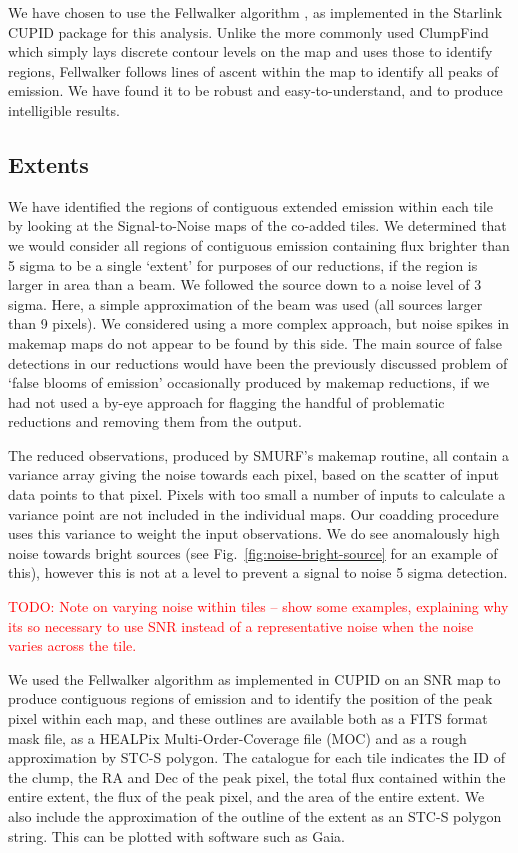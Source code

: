 \documentclass[usenatbib]{mnras}
\newcommand{\todo}[1]{\textcolor{red}{TODO: #1}}
\begin{document}
We have chosen to use the Fellwalker algorithm \citep{Berry2015}, as
implemented in the Starlink CUPID \citep{cupid} package for this
analysis. Unlike the more commonly used ClumpFind which simply lays
discrete contour levels on the map and uses those to identify regions,
Fellwalker follows lines of ascent within the map to identify all
peaks of emission. We have found it to be robust and
easy-to-understand, and to produce intelligible results.

\subsection{Extents}

We have identified the regions of contiguous extended emission within
each tile by looking at the Signal-to-Noise maps of the co-added
tiles. We determined that we would consider all regions of contiguous
emission containing flux brighter than 5 sigma to be a single `extent'
for purposes of our reductions, if the region is larger in area than a
beam. We followed the source down to a noise level of 3 sigma.  Here,
a simple approximation of the beam was used (all sources larger than 9
pixels). We considered using a more complex approach, but noise spikes
in makemap maps do not appear to be found by this side. The main
source of false detections in our reductions would have been the
previously discussed problem of `false blooms of emission'
occasionally produced by makemap reductions, if we had not used a
by-eye approach for flagging the handful of problematic reductions and
removing them from the output.

The reduced observations, produced by SMURF's makemap routine, all
contain a variance array giving the noise towards each pixel, based on
the scatter of input data points to that pixel. Pixels with too small
a number of inputs to calculate a variance point are not included in
the individual maps. Our coadding procedure uses this variance to
weight the input observations. We do see anomalously high noise
towards bright sources (see Fig.~\ref{fig:noise-bright-source} for an
example of this), however this is not at a level to prevent a signal
to noise 5 sigma detection.

\todo{Note on varying noise within tiles -- show some examples,
  explaining why its so necessary to use SNR instead of a
  representative noise when the noise varies across the tile.}

We used the Fellwalker algorithm as implemented in CUPID on an SNR map
to produce contiguous regions of emission and to identify the position
of the peak pixel within each map, and these outlines are available
both as a FITS format mask file, as a HEALPix Multi-Order-Coverage
file (MOC) and as a rough approximation by STC-S polygon. The
catalogue for each tile indicates the ID of the clump, the RA and Dec
of the peak pixel, the total flux contained within the entire extent,
the flux of the peak pixel, and the area of the entire extent. We also
include the approximation of the outline of the extent as an STC-S
polygon string. This can be plotted with software such as Gaia.
\end{document}
